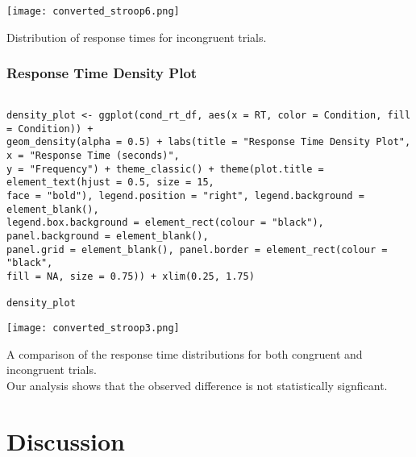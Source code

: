 \documentclass{article}
\begin{document}
\begin{center}
\texttt{[image: converted\_stroop6.png]}
\end{center}

\begin{center}
Distribution of response times for incongruent trials.
\end{center}
\subsubsection{Response Time Density Plot}
\label{sec:org8b7871e}
\begin{verbatim}

density_plot <- ggplot(cond_rt_df, aes(x = RT, color = Condition, fill = Condition)) + 
geom_density(alpha = 0.5) + labs(title = "Response Time Density Plot", x = "Response Time (seconds)", 
y = "Frequency") + theme_classic() + theme(plot.title = element_text(hjust = 0.5, size = 15, 
face = "bold"), legend.position = "right", legend.background = element_blank(), 
legend.box.background = element_rect(colour = "black"), panel.background = element_blank(), 
panel.grid = element_blank(), panel.border = element_rect(colour = "black", 
fill = NA, size = 0.75)) + xlim(0.25, 1.75) 

density_plot

\end{verbatim}

\begin{center}
\texttt{[image: converted\_stroop3.png]}
\end{center}

\begin{center}
A comparison of the response time distributions for both congruent and incongruent trials.\\ Our analysis shows that the observed difference is not statistically signficant.
\end{center}

\section{Discussion}
\label{sec:orgdbd8153}
\end{document}
